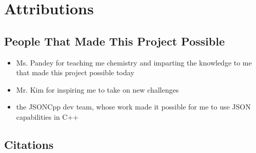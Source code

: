 
\section{Attributions}

\subsection{People That Made This Project Possible}
\begin{itemize}
    \item Ms. Pandey for teaching me chemistry and imparting the knowledge to me that made this project possible today
    \item Mr. Kim for inspiring me to take on new challenges 
    \item the JSONCpp dev team, whose work made it possible for me to use JSON capabilities in C++
\end{itemize}

\subsection{Citations} 
\nocite{*}
\printbibliography[heading=none]
